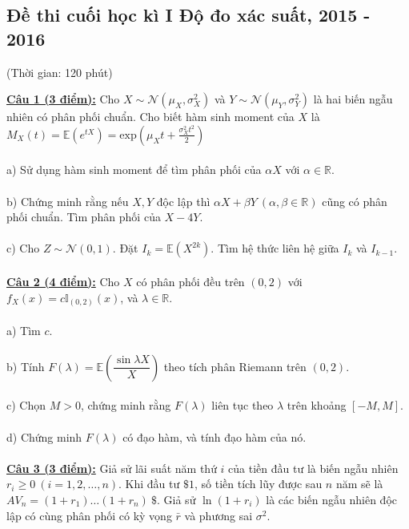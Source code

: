\documentclass[10pt, a4paper]{article}
\begin{document}
\subsection{Đề thi cuối học kì I Độ đo xác suất, 2015 - 2016}
\begin{center}
	\color{blue}(Thời gian: 120 phút)
\end{center}
\color{red}\underline{\textbf{Câu 1 (3 điểm):}} \color{black}Cho $X\sim\mathcal N\left(\mu_X,\sigma_X^2\right)$ và $Y\sim\mathcal N\left(\mu_Y,\sigma_Y^2\right)$ là hai biến ngẫu nhiên có phân phối chuẩn. Cho biết hàm sinh moment của $X$ là $M_X(t)=\mathbb E\left(e^{tX}\right)=\text{exp}\left(\mu_Xt+\frac{\sigma_X^2t^2}{2}\right)$\\\\
\color{red}a) \color{black}Sử dụng hàm sinh moment để tìm phân phối của $\alpha X$ với $\alpha\in\mathbb R$.\\\\
\color{red}b) \color{black}Chứng minh rằng nếu $X,Y$ độc lập thì $\alpha X+\beta Y~(\alpha,\beta\in\mathbb R)$ cũng có phân phối chuẩn. Tìm phân phối của $X-4Y$.\\\\
\color{red}c) \color{black}Cho $Z\sim\mathcal N(0,1)$. Đặt $I_k=\mathbb E\left(X^{2k}\right)$. Tìm hệ thức liên hệ giữa $I_k$ và $I_{k-1}$.\\\\
\color{red}\underline{\textbf{Câu 2 (4 điểm):}} \color{black}Cho $X$ có phân phối đều trên $(0,2)$ với $f_X(x)=c\mathbb I_{(0,2)}(x)$, và $\lambda\in\mathbb R$.\\\\
\color{red}a) \color{black}Tìm $c$.\\\\
\color{red}b) \color{black}Tính $F(\lambda)=\mathbb E\left(\dfrac{\sin\lambda X}{X}\right)$ theo tích phân Riemann trên $(0,2)$.\\\\
\color{red}c) \color{black}Chọn $M>0$, chứng minh rằng $F(\lambda)$ liên tục theo $\lambda$ trên khoảng $[-M,M]$.\\\\
\color{red}d) \color{black}Chứng minh $F(\lambda)$ có đạo hàm, và tính đạo hàm của nó.\\\\
\color{red}\underline{\textbf{Câu 3 (3 điểm):}} \color{black}Giả sử lãi suất năm thứ $i$ của tiền đầu tư là biến ngẫu nhiên $r_i\ge0~(i=1,2,\dots,n)$. Khi đầu tư $\$1$, số tiền tích lũy được sau $n$ năm sẽ là $AV_n=(1+r_1)\dots(1+r_n)~\$$. Giả sử $\ln(1+r_i)$ là các biến ngẫu nhiên độc lập có cùng phân phối có kỳ vọng $\bar r$ và phương sai $\sigma^2$.\\\\
\end{document}

